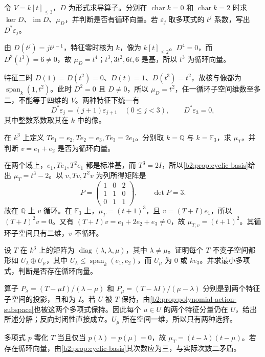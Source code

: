 \begin{exercise}\label{b2:ex:01-derivative-dual}
	令 \(V=k[t]_{\le3}\)，\(D\) 为形式求导算子。分别在 \(\operatorname{char}k=0\) 和 \(\operatorname{char}k=2\) 时求 \(\ker D\)、\(\operatorname{im}D\)、\(\mu_D\)，并判断是否有循环向量。若 \(\varepsilon_j\) 取多项式的 \(t^j\) 系数，写出 \(D^*\varepsilon_j\)。
\end{exercise}
\begin{solution}
	由 \(D(t^j)=jt^{j-1}\)，特征零时核为 \(k\)，像为 \(k[t]_{\le2}\)。\(D^4=0\)，而 \(D^3(t^3)=6\ne0\)，故 \(\mu_D=t^4\)；\(t^3,3t^2,6t,6\) 是基，所以 \(t^3\) 为循环向量。

	特征二时 \(D(1)=D(t^2)=0\)、\(D(t)=1\)、\(D(t^3)=t^2\)，故核与像都为 \(\operatorname{span}_k(1,t^2)\)。此时 \(D^2=0\) 且 \(D\ne0\)，所以 \(\mu_D=t^2\)，任一循环子空间维数至多二，不能等于四维的 \(V\)。两种特征下统一有
	\[
		D^*\varepsilon_j=(j+1)\varepsilon_{j+1}\quad(0\le j<3),\qquad D^*\varepsilon_3=0,
	\]
	其中整数系数取其在 \(k\) 中的像。
\end{solution}

\begin{exercise}\label{b2:ex:01-cyclic-characteristic}
	在 \(k^3\) 上定义 \(Te_1=e_2,Te_2=e_3,Te_3=2e_1\)。分别取 \(k=\mathbb Q\) 与 \(k=\mathbb F_3\)，求 \(\mu_T\)，并判断 \(v=e_1+e_2\) 是否为循环向量。
\end{exercise}
\begin{solution}
	在两个域上，\(e_1,Te_1,T^2e_1\) 都是标准基，而 \(T^3=2I\)，所以\cref{b2:prop:cyclic-basis}给出 \(\mu_T=t^3-2\)。以 \(v,Tv,T^2v\) 为列所得矩阵是
	\[
		P=\begin{pmatrix}1&0&2\\1&1&0\\0&1&1\end{pmatrix},\qquad\det P=3.
	\]
	故在 \(\mathbb Q\) 上 \(v\) 循环。在 \(\mathbb F_3\) 上，\(\mu_T=(t+1)^3\)，且 \(v=(T+I)e_1\)，所以 \((T+I)^2v=0\)。又有 \((T+I)v=e_1+2e_2+e_3\ne0\)，故 \(\mu_{T,v}=(t+1)^2\)。其循环子空间只有二维，\(v\) 不循环。
\end{solution}

\begin{exercise}\label{b2:ex:01-invariant-subspaces}
	设 \(T\) 在 \(k^3\) 上的矩阵为 \(\operatorname{diag}(\lambda,\lambda,\mu)\)，其中 \(\lambda\ne\mu\)。证明每个 \(T\) 不变子空间都形如 \(U_\lambda\oplus U_\mu\)，其中 \(U_\lambda\le\operatorname{span}_k(e_1,e_2)\)，而 \(U_\mu\) 为 \(0\) 或 \(ke_3\)。并求最小多项式，判断是否存在循环向量。
\end{exercise}
\begin{solution}
	算子 \(P_\lambda=(T-\mu I)/(\lambda-\mu)\) 和 \(P_\mu=(T-\lambda I)/(\mu-\lambda)\) 分别是到两个特征子空间的投影，且和为 \(I\)。若 \(U\) 被 \(T\) 保持，由\cref{b2:prop:polynomial-action-subspace}也被这两个多项式保持。因此每个 \(u\in U\) 的两个特征分量仍在 \(U\)，给出所述分解；反向封闭性直接成立。\(U_\mu\) 所在空间一维，所以只有两种选择。

	多项式 \(p\) 零化 \(T\) 当且仅当 \(p(\lambda)=p(\mu)=0\)，故 \(\mu_T=(t-\lambda)(t-\mu)\)。若存在循环向量，由\cref{b2:prop:cyclic-basis}其次数应为三，与实际次数二矛盾。
\end{solution}

